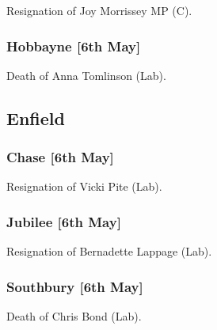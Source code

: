\documentclass[a4paper,openany]{book}
\begin{document}
\begin{resultsiii}

Resignation of Joy Morrissey MP (C).

\subsubsection*{Hobbayne \hspace*{\fill}\nolinebreak[1]%
	\enspace\hspace*{\fill}
	[6th May]}


Death of Anna Tomlinson (Lab).

\subsection*{Enfield}

\subsubsection*{Chase \hspace*{\fill}\nolinebreak[1]%
	\enspace\hspace*{\fill}
	[6th May]}


Resignation of Vicki Pite (Lab).

\subsubsection*{Jubilee \hspace*{\fill}\nolinebreak[1]%
	\enspace\hspace*{\fill}
	[6th May]}


Resignation of Bernadette Lappage (Lab).

\subsubsection*{Southbury \hspace*{\fill}\nolinebreak[1]%
	\enspace\hspace*{\fill}
	[6th May]}


Death of Chris Bond (Lab).


\end{resultsiii}
\end{document}
